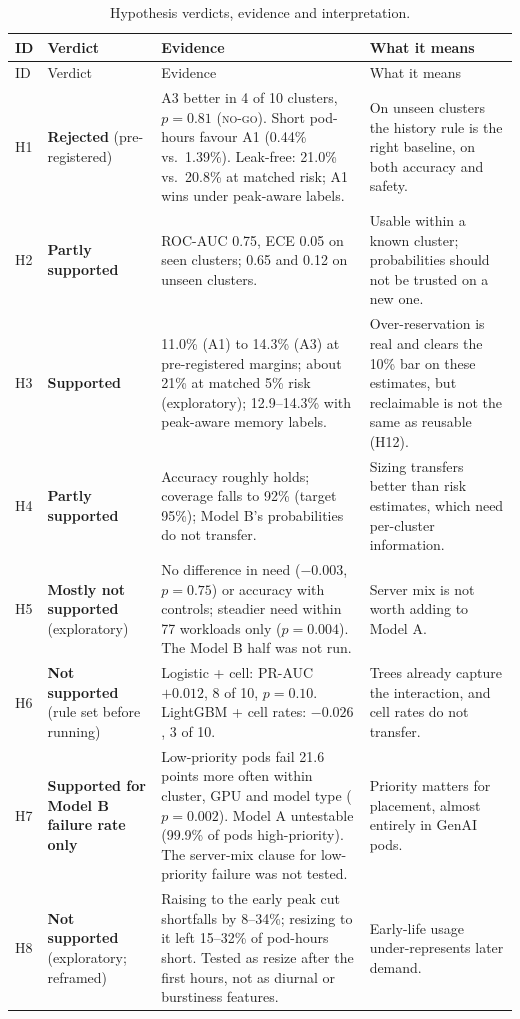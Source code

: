 \documentclass[11pt]{article}
\begin{document}
\begin{longtable}{@{}P{0.8cm}P{2.5cm}P{6.8cm}P{5.1cm}@{}}
\caption{Hypothesis verdicts, evidence and interpretation.}\label{tab:verdicts}\\
\toprule
ID & Verdict & Evidence & What it means \\
\midrule
\endfirsthead
\toprule
ID & Verdict & Evidence & What it means \\
\midrule
\endhead
H1 & \textbf{Rejected} (pre-registered) & A3 better in 4 of 10 clusters, $p = 0.81$ (\textsc{no-go}). Short pod-hours favour A1 (0.44\% vs.\ 1.39\%). Leak-free: 21.0\% vs.\ 20.8\% at matched risk; A1 wins under peak-aware labels. & On unseen clusters the history rule is the right baseline, on both accuracy and safety. \\
H2 & \textbf{Partly supported} & ROC-AUC 0.75, ECE 0.05 on seen clusters; 0.65 and 0.12 on unseen clusters. & Usable within a known cluster; probabilities should not be trusted on a new one. \\
H3 & \textbf{Supported} & 11.0\% (A1) to 14.3\% (A3) at pre-registered margins; about 21\% at matched 5\% risk (exploratory); 12.9--14.3\% with peak-aware memory labels. & Over-reservation is real and clears the 10\% bar on these estimates, but reclaimable is not the same as reusable (H12). \\
H4 & \textbf{Partly supported} & Accuracy roughly holds; coverage falls to 92\% (target 95\%); Model B's probabilities do not transfer. & Sizing transfers better than risk estimates, which need per-cluster information. \\
H5 & \textbf{Mostly not supported} (exploratory) & No difference in need ($-0.003$, $p = 0.75$) or accuracy with controls; steadier need within 77 workloads only ($p = 0.004$). The Model B half was not run. & Server mix is not worth adding to Model A. \\
H6 & \textbf{Not supported} (rule set before running) & Logistic + cell: PR-AUC $+0.012$, 8 of 10, $p = 0.10$. LightGBM + cell rates: $-0.026$, 3 of 10. & Trees already capture the interaction, and cell rates do not transfer. \\
H7 & \textbf{Supported for Model B failure rate only} & Low-priority pods fail 21.6 points more often within cluster, GPU and model type ($p = 0.002$). Model A untestable (99.9\% of pods high-priority). The server-mix clause for low-priority failure was not tested. & Priority matters for placement, almost entirely in GenAI pods. \\
H8 & \textbf{Not supported} (exploratory; reframed) & Raising to the early peak cut shortfalls by 8--34\%; resizing to it left 15--32\% of pod-hours short. Tested as resize after the first hours, not as diurnal or burstiness features. & Early-life usage under-represents later demand. \\

\end{longtable}
\end{document}
